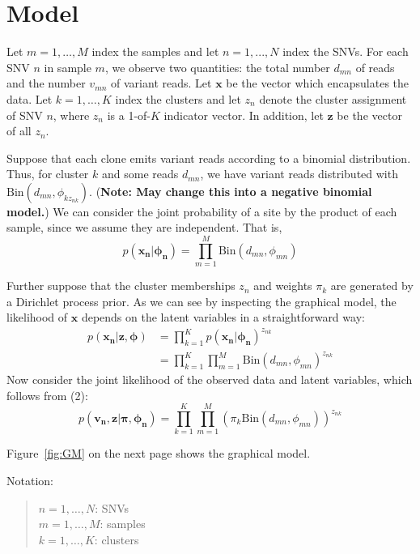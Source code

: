 \documentclass[11pt]{article}
\newcommand{\bx}{\ensuremath{\mathbf{x}}}
\newcommand{\bz}{\ensuremath{\mathbf{z}}}
\begin{document}
\newpage

\section{Model}

Let $m = 1, \ldots, M$ index the samples and let $n = 1, ..., N$ index the SNVs. For each SNV $n$ in sample $m$, we observe two quantities: the total number $d_{mn}$ of reads and the number $v_{mn}$ of variant reads. Let $\bx$ be the vector which encapsulates the data. Let $k=1,\ldots,K$ index the clusters and let $z_n$ denote the cluster assignment of SNV $n$, where $z_n$ is a 1-of-$K$ indicator vector. In addition, let $\bz$ be the vector of all $z_n$.

Suppose that each clone emits variant reads according to a binomial distribution. Thus, for cluster $k$ and some reads $d_{mn}$, we have variant reads distributed with $\mathrm{Bin}(d_{mn}, \phi_{kz_{nk}})$. (\textbf{Note: May change this into a negative binomial model.}) We can consider the joint probability of a site by the product of each sample, since we assume they are independent. That is,
\begin{equation}
p(\mathbf{x_n} | \mathbf{\phi_n}) = \prod\limits_{m=1}^M \mathrm{Bin}(d_{mn}, \phi_{mn})
\end{equation}

Further suppose that the cluster memberships $z_n$ and weights $\pi_k$ are generated by a Dirichlet process prior. As we can see by inspecting the graphical model, the likelihood of $\bx$ depends on the latent variables in a straightforward way:
\begin{align}
p(\mathbf{x_n} | \bz, \mathbf{\phi}) &= \prod\limits_{k=1}^K p(\mathbf{x_n} | \mathbf{\phi_n})^{z_{nk}} \nonumber \\
										&= \prod\limits_{k=1}^K \prod\limits_{m=1}^M \mathrm{Bin}(d_{mn}, \phi_{mn})^{z_{nk}}
\end{align}
Now consider the joint likelihood of the observed data and latent variables, which follows from (2): 
\begin{equation}
p(\mathbf{v_n}, \bz | \mathbf{\pi}, \mathbf{\phi_n}) = \prod\limits_{k=1}^K \prod\limits_{m=1}^M \left(\pi_k \mathrm{Bin}(d_{mn}, \phi_{mn})\right)^{z_{nk}}
\end{equation}

Figure~\ref{fig:GM} on the next page shows the graphical model.

\newpage
Notation:

\begin{quote}
$n = 1, \ldots , N$:  SNVs \\
$m = 1, \ldots , M$: samples \\
$k = 1, \ldots ,  K$: clusters
\end{quote}
\end{document}
